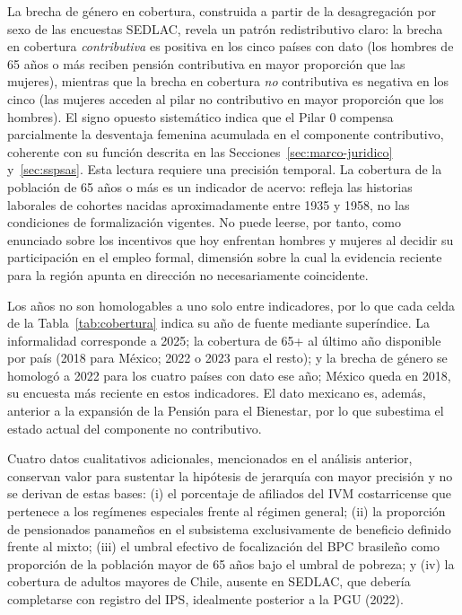\documentclass[12pt, letterpaper]{article}
\begin{document}
La brecha de género en cobertura, construida a partir de la desagregación por sexo de las encuestas SEDLAC, revela un patrón redistributivo claro: la brecha en cobertura \textit{contributiva} es positiva en los cinco países con dato (los hombres de 65 años o más reciben pensión contributiva en mayor proporción que las mujeres), mientras que la brecha en cobertura \textit{no} contributiva es negativa en los cinco (las mujeres acceden al pilar no contributivo en mayor proporción que los hombres). El signo opuesto sistemático indica que el Pilar 0 compensa parcialmente la desventaja femenina acumulada en el componente contributivo, coherente con su función descrita en las Secciones~\ref{sec:marco-juridico} y~\ref{sec:sspsas}. Esta lectura requiere
una precisión temporal. La cobertura de la población de 65 años o más es un
indicador de acervo: refleja las historias laborales de cohortes nacidas
aproximadamente entre 1935 y 1958, no las condiciones de formalización vigentes.
No puede leerse, por tanto, como enunciado sobre los incentivos que hoy enfrentan
hombres y mujeres al decidir su participación en el empleo formal, dimensión sobre
la cual la evidencia reciente para la región apunta en dirección no necesariamente
coincidente.

Los años no son homologables a uno solo entre indicadores, por lo que cada celda de la Tabla~\ref{tab:cobertura} indica su año de fuente mediante superíndice. La informalidad corresponde a 2025; la cobertura de 65+ al último año disponible por país (2018 para México; 2022 o 2023 para el resto); y la brecha de género se homologó a 2022 para los cuatro países con dato ese año; México queda en 2018, su encuesta más reciente en estos indicadores. El dato mexicano es, además, anterior a la expansión de la Pensión para el Bienestar, por lo que subestima el estado actual del componente no contributivo.

Cuatro datos cualitativos adicionales, mencionados en el análisis anterior, conservan valor para sustentar la hipótesis de jerarquía con mayor precisión y no se derivan de estas bases: (i) el porcentaje de afiliados del IVM costarricense que pertenece a los regímenes especiales frente al régimen general; (ii) la proporción de pensionados panameños en el subsistema exclusivamente de beneficio definido frente al mixto; (iii) el umbral efectivo de focalización del BPC brasileño como proporción de la población mayor de 65 años bajo el umbral de pobreza; y (iv) la cobertura de adultos mayores de Chile, ausente en SEDLAC, que debería completarse con registro del IPS, idealmente posterior a la PGU (2022).
\end{document}
